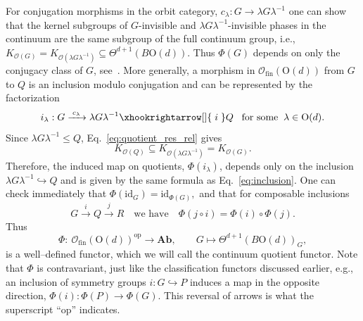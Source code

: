 \documentclass[aps,prx,reprint,superscriptaddress,twocolumn,amsmath,amssymb,amsfonts, nofootinbib]{revtex4-2}
\newcommand{\ofin}{\mathcal{O}_{\text{fin}}}
\theoremstyle{apsstyle}
\begin{document}
For conjugation morphisms in the orbit category, $c_{\lambda}: G \to \lambda G\lambda ^{-1}$ one can show that the kernel subgroups of $G$-invisible and $\lambda G\lambda ^{-1}$-invisible phases in the continuum are the same subgroup of the full continuum group, i.e., $K_{\mathcal{O}(G)}=K_{\mathcal{O}(\lambda G\lambda ^{-1})}\subseteq \Theta^{d+1}(B\mathrm{O}(d))$. Thus $\Phi(G)$ depends on only the conjugacy class of $G$, see~\cite{note_conjugation}. More generally, a morphism in $\ofin(\mathrm{O}(d))$ from $G$ to $Q$ is an inclusion modulo conjugation and can be represented by the factorization  
\begin{equation*}
i_{\lambda}:G\xrightarrow{\;c_{\lambda}\;} \lambda G\lambda ^{-1} \xhookrightarrow[]{\;i\;} Q \;\;\;\text{for some}\;\; \lambda\in \mathrm{O}(d).
\end{equation*} 
Since $\lambda G\lambda^{-1}\le Q$, Eq.~\eqref{eq:quotient_res_rel} gives
\begin{equation*}
K_{\mathcal O(Q)} \subseteq K_{\mathcal O(\lambda G\lambda^{-1})} = K_{\mathcal O(G)}.
\end{equation*}
Therefore, the induced map on quotients, $\Phi(i_\lambda)$, depends only on the inclusion $\lambda G\lambda^{-1}\hookrightarrow Q$ and is given by the same formula as Eq.~\eqref{eq:inclusion}.
One can check immediately that $\Phi(\mathrm{id}_{G})=\mathrm{id}_{\Phi(G)},$ and that for composable inclusions 
\begin{equation*}
G\xrightarrow{i} Q\xrightarrow{j} R\quad  \text{we have} \quad \Phi(j\circ i)=\Phi(i)\circ\Phi(j).
\end{equation*}
Thus
\begin{equation}
    \Phi:\ \ofin(\mathrm{O}(d))^{\mathrm{op}}\longrightarrow \mathbf{Ab},\qquad
    G\longmapsto \Theta^{d+1}(B\mathrm{O}(d))_{G},
    \label{eq:refine_domain}
\end{equation}
is a well–defined functor, which we will call the continuum quotient functor. Note that $\Phi$ is contravariant, just like the classification functors discussed earlier, e.g., an inclusion of symmetry groups $i:G\hookrightarrow P$ induces a map in the opposite direction, $\Phi(i):\Phi(P)\to \Phi(G)$. This reversal of arrows is what the superscript ``$\mathrm{op}$'' indicates.
\end{document}
